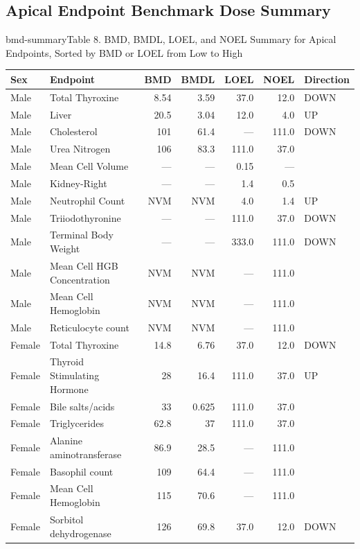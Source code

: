 \subsection{Apical Endpoint Benchmark Dose Summary}



\begin{niehstable}{bmd-summary}{Table 8. BMD, BMDL, LOEL, and NOEL Summary for Apical Endpoints, Sorted by BMD or LOEL from Low to High}
\begin{tabular}{l l r r r r l}
\toprule
Sex & Endpoint & BMD & BMDL & LOEL & NOEL & Direction \\
\midrule
Male & Total Thyroxine & 8.54 & 3.59 & 37.0 & 12.0 & DOWN \\
Male & Liver & 20.5 & 3.04 & 12.0 & 4.0 & UP \\
Male & Cholesterol & 101 & 61.4 & — & 111.0 & DOWN \\
Male & Urea Nitrogen & 106 & 83.3 & 111.0 & 37.0 &  \\
Male & Mean Cell Volume & — & — & 0.15 & — &  \\
Male & Kidney-Right & — & — & 1.4 & 0.5 &  \\
Male & Neutrophil Count & NVM & NVM & 4.0 & 1.4 & UP \\
Male & Triiodothyronine & — & — & 111.0 & 37.0 & DOWN \\
Male & Terminal Body Weight & — & — & 333.0 & 111.0 & DOWN \\
Male & Mean Cell HGB Concentration & NVM & NVM & — & 111.0 &  \\
Male & Mean Cell Hemoglobin & NVM & NVM & — & 111.0 &  \\
Male & Reticulocyte count & NVM & NVM & — & 111.0 &  \\
Female & Total Thyroxine & 14.8 & 6.76 & 37.0 & 12.0 & DOWN \\
Female & Thyroid Stimulating Hormone & 28 & 16.4 & 111.0 & 37.0 & UP \\
Female & Bile salts/acids & 33 & 0.625 & 111.0 & 37.0 &  \\
Female & Triglycerides & 62.8 & 37 & 111.0 & 37.0 &  \\
Female & Alanine aminotransferase & 86.9 & 28.5 & — & 111.0 &  \\
Female & Basophil count & 109 & 64.4 & — & 111.0 &  \\
Female & Mean Cell Hemoglobin & 115 & 70.6 & — & 111.0 &  \\
Female & Sorbitol dehydrogenase & 126 & 69.8 & 37.0 & 12.0 & DOWN \\

\end{tabular}
\end{niehstable}
